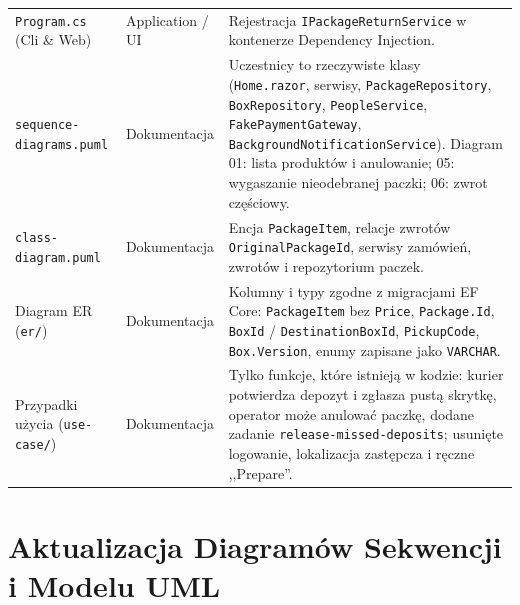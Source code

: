 \documentclass[10.5pt,a4paper]{article}
\begin{document}
\begin{table}[h!]
\begin{tabularx}{\textwidth}{l p{3.0cm} X}
\texttt{Program.cs} (Cli \& Web) & Application / UI & Rejestracja \texttt{IPackageReturnService} w kontenerze Dependency Injection. \\
\addlinespace
\texttt{sequence-diagrams.puml} & Dokumentacja & Uczestnicy to rzeczywiste klasy (\texttt{Home.razor}, serwisy, \texttt{PackageRepository}, \texttt{BoxRepository}, \texttt{PeopleService}, \texttt{FakePaymentGateway}, \texttt{BackgroundNotificationService}). Diagram 01: lista produktów i anulowanie; 05: wygaszanie nieodebranej paczki; 06: zwrot częściowy. \\
\addlinespace
\texttt{class-diagram.puml} & Dokumentacja & Encja \texttt{PackageItem}, relacje zwrotów \texttt{OriginalPackageId}, serwisy zamówień, zwrotów i repozytorium paczek. \\
\addlinespace
Diagram ER (\texttt{er/}) & Dokumentacja & Kolumny i typy zgodne z migracjami EF Core: \texttt{PackageItem} bez \texttt{Price}, \texttt{Package.Id}, \texttt{BoxId} / \texttt{DestinationBoxId}, \texttt{PickupCode}, \texttt{Box.Version}, enumy zapisane jako \texttt{VARCHAR}. \\
\addlinespace
Przypadki użycia (\texttt{use-case/}) & Dokumentacja & Tylko funkcje, które istnieją w kodzie: kurier potwierdza depozyt i zgłasza pustą skrytkę, operator może anulować paczkę, dodane zadanie \texttt{release-missed-deposits}; usunięte logowanie, lokalizacja zastępcza i ręczne ,,Prepare''. \\
\bottomrule
\end{tabularx}
\end{table}

\section{Aktualizacja Diagramów Sekwencji i Modelu UML}
\end{document}
